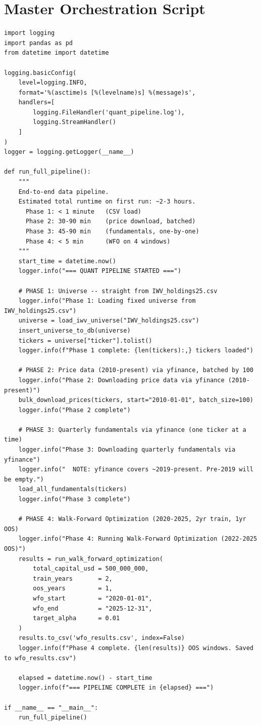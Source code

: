 \documentclass[11pt, oneside]{book}
\begin{document}
\section{Master Orchestration Script}

\begin{lstlisting}[style=pythonstyle, caption={Main Pipeline Runner}]
import logging
import pandas as pd
from datetime import datetime

logging.basicConfig(
    level=logging.INFO,
    format='%(asctime)s [%(levelname)s] %(message)s',
    handlers=[
        logging.FileHandler('quant_pipeline.log'),
        logging.StreamHandler()
    ]
)
logger = logging.getLogger(__name__)

def run_full_pipeline():
    """
    End-to-end data pipeline.
    Estimated total runtime on first run: ~2-3 hours.
      Phase 1: < 1 minute   (CSV load)
      Phase 2: 30-90 min    (price download, batched)
      Phase 3: 45-90 min    (fundamentals, one-by-one)
      Phase 4: < 5 min      (WFO on 4 windows)
    """
    start_time = datetime.now()
    logger.info("=== QUANT PIPELINE STARTED ===")

    # PHASE 1: Universe -- straight from IWV_holdings25.csv
    logger.info("Phase 1: Loading fixed universe from IWV_holdings25.csv")
    universe = load_iwv_universe("IWV_holdings25.csv")
    insert_universe_to_db(universe)
    tickers = universe["ticker"].tolist()
    logger.info(f"Phase 1 complete: {len(tickers):,} tickers loaded")

    # PHASE 2: Price data (2010-present) via yfinance, batched by 100
    logger.info("Phase 2: Downloading price data via yfinance (2010-present)")
    bulk_download_prices(tickers, start="2010-01-01", batch_size=100)
    logger.info("Phase 2 complete")

    # PHASE 3: Quarterly fundamentals via yfinance (one ticker at a time)
    logger.info("Phase 3: Downloading quarterly fundamentals via yfinance")
    logger.info("  NOTE: yfinance covers ~2019-present. Pre-2019 will be empty.")
    load_all_fundamentals(tickers)
    logger.info("Phase 3 complete")

    # PHASE 4: Walk-Forward Optimization (2020-2025, 2yr train, 1yr OOS)
    logger.info("Phase 4: Running Walk-Forward Optimization (2022-2025 OOS)")
    results = run_walk_forward_optimization(
        total_capital_usd = 500_000_000,
        train_years       = 2,
        oos_years         = 1,
        wfo_start         = "2020-01-01",
        wfo_end           = "2025-12-31",
        target_alpha      = 0.01
    )
    results.to_csv('wfo_results.csv', index=False)
    logger.info(f"Phase 4 complete. {len(results)} OOS windows. Saved to wfo_results.csv")

    elapsed = datetime.now() - start_time
    logger.info(f"=== PIPELINE COMPLETE in {elapsed} ===")

if __name__ == "__main__":
    run_full_pipeline()
\end{lstlisting}
\end{document}
